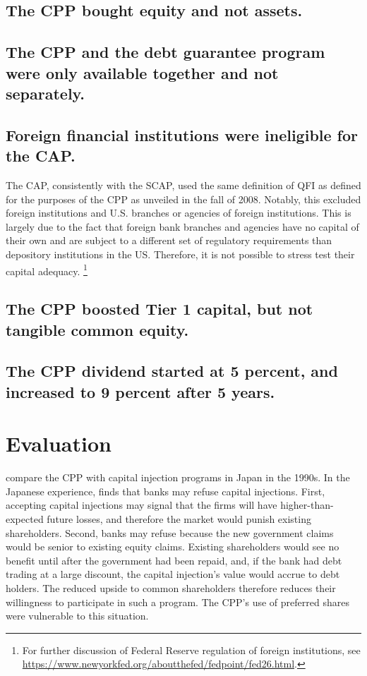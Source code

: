 \documentclass[12pt]{article}
\begin{document}
\subsection{The CPP bought equity and not assets.}

\subsection{The CPP and the debt guarantee program were only available together and not separately.}

\subsection{Foreign financial institutions were ineligible for the CAP.}

The CAP, consistently with the SCAP, used the same definition of QFI as defined for the purposes of the CPP as unveiled in the fall of 2008. Notably, this excluded foreign institutions and U.S. branches or agencies of foreign institutions. This is largely due to the fact that foreign bank branches and agencies have no capital of their own and are subject to a different set of regulatory requirements than depository institutions in the US. Therefore, it is not possible to stress test their capital adequacy. \footnote{For further discussion of Federal Reserve regulation of foreign institutions, see \url{https://www.newyorkfed.org/aboutthefed/fedpoint/fed26.html}.}

\subsection{The CPP boosted Tier 1 capital, but not tangible common equity.}

\subsection{The CPP dividend started at 5 percent, and increased to 9 percent after 5 years.}

\section{Evaluation}

\citet{Hoshi} compare the CPP with capital injection programs in Japan in the 1990s. In the Japanese experience, \citet{Hoshi} finds that banks may refuse capital injections. First, accepting capital injections may signal that the firms will have higher-than-expected future losses, and therefore the market would punish existing shareholders. Second, banks may refuse because the new government claims would be senior to existing equity claims. Existing shareholders would see no benefit until after the government had been repaid, and, if the bank had debt trading at a large discount, the capital injection's value would accrue to debt holders. The reduced upside to common shareholders therefore reduces their willingness to participate in such a program. The CPP's use of preferred shares were vulnerable to this situation. 
\end{document}
